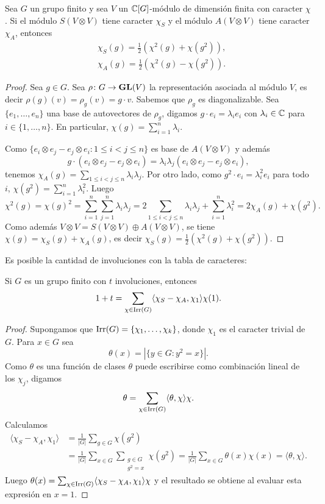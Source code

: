 \begin{proposition}
    Sea $G$ un grupo finito y  
    sea $V$ un $\mathbb{C}[G]$-módulo de dimensión finita con caracter $\chi$. Si el módulo $S(V\otimes V)$ 
    tiene caracter $\chi_S$ y el módulo $A(V\otimes V)$ tiene caracter $\chi_A$, entonces 
    \begin{align*}
        &\chi_S(g)=\frac12(\chi^2(g)+\chi(g^2)),\\
        &\chi_A(g)=\frac12(\chi^2(g)-\chi(g^2)).
    \end{align*}
\end{proposition}

\begin{proof}
    Sea $g\in G$. Sea $\rho\colon G\to\mathbf{GL}(V)$ la representación asociada al módulo $V$, es decir $\rho(g)(v)=\rho_g(v)=g\cdot v$. 
    Sabemos que $\rho_g$ es diagonalizable. Sea $\{e_1,\dots,e_n\}$ una base de autovectores de $\rho_g$, digamos
    $g\cdot e_i=\lambda_ie_i$ con $\lambda_i\in\mathbb{C}$ para $i\in\{1,\dots,n\}$. En particular, $\chi(g)=\sum_{i=1}^n\lambda_i$. 
    
    Como $\{e_i\otimes e_j-e_j\otimes e_i:1\leq i<j\leq n\}$ es base de $A(V\otimes V)$ y además 
    \[
    g\cdot (e_i\otimes e_j-e_j\otimes e_i)=\lambda_i\lambda_j(e_i\otimes e_j-e_j\otimes e_i),
    \]
    tenemos $\chi_A(g)=\sum_{1\leq i<j\leq n}\lambda_i\lambda_j$. Por otro lado, como $g^2\cdot e_i=\lambda_i^2e_i$ para todo $i$,
    $\chi(g^2)=\sum_{i=1}^n\lambda_i^2$. Luego
    \[
    \chi^2(g)=\chi(g)^2=\sum_{i=1}^n\sum_{j=1}^n\lambda_i\lambda_j=2\sum_{1\leq i<j\leq n}\lambda_i\lambda_j+\sum_{i=1}^n\lambda_i^2=2\chi_A(g)+\chi(g^2).
    \]
    Como además $V\otimes V=S(V\otimes V)\oplus A(V\otimes V)$, se tiene 
    $\chi(g)=\chi_S(g)+\chi_A(g)$, es decir 
    $\chi_S(g)=\frac12(\chi^2(g)+\chi(g^2))$.
\end{proof}

Es posible la cantidad de involuciones 
con la tabla de caracteres:

\begin{proposition}
Si $G$ es un grupo finito con $t$ involuciones, entonces 
\[
1+t=\sum_{\chi\in\operatorname{Irr}(G)}\langle\chi_S-\chi_A,\chi_1\rangle\chi(1).
\]
\end{proposition}

\begin{proof}
Supongamos que $\operatorname{Irr}(G)=\{\chi_1,\dots,\chi_k\}$, donde $\chi_1$ es el caracter trivial de $G$. 
Para $x\in G$ sea 
\[
\theta(x)=|\{y\in G:y^2=x\}|.
\]
Como $\theta$ es una función de clases
$\theta$ puede escribirse como combinación lineal de los $\chi_j$, digamos
\[
\theta=\sum_{\chi\in\operatorname{Irr}(G)}\langle\theta,\chi\rangle\chi.
\]
Calculamos
\begin{align*}
    \langle\chi_S-\chi_A,\chi_1\rangle 
    &=\frac{1}{|G|}\sum_{g\in G}\chi(g^2)\\
    &=\frac{1}{|G|}\sum_{x\in G}\sum_{\substack{g\in G\\g^2=x}}\chi(g^2)
    =\frac{1}{|G|}\sum_{x\in G}\theta(x)\chi(x)=\langle\theta,\chi\rangle.
\end{align*}
Luego $\theta(x)=\sum_{\chi\in\operatorname{Irr}(G)}\langle\chi_S-\chi_A,\chi_1\rangle\chi$ y el resultado se obtiene
al evaluar esta expresión en $x=1$. 
\end{proof}


